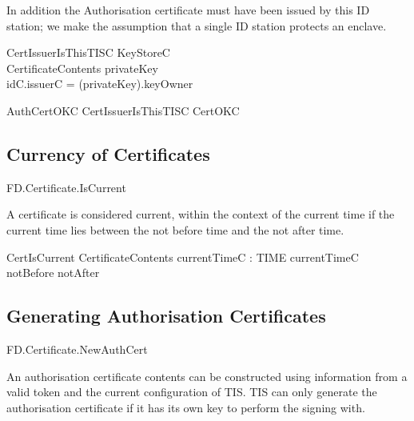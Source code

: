 In addition the Authorisation certificate must have been issued by this ID
station; we make the assumption that a single ID station protects an enclave.

\begin{schema}{CertIssuerIsThisTISC}
        KeyStoreC
\\      CertificateContents
\where
        privateKey \neq \Nil
\\      idC.issuerC = (\The privateKey).keyOwner
\end{schema}

\begin{zed}
        AuthCertOKC  CertIssuerIsThisTISC \land CertOKC
\end{zed}



\subsection{Currency of Certificates}

\begin{traceunit}{FD.Certificate.IsCurrent}
\end{traceunit}

A certificate is considered current, within the context of the current
time if the current time lies between the not before time and the not
after time.

\begin{schema}{CertIsCurrent}
        CertificateContents
\also
        currentTimeC : TIME
\where
        currentTimeC \in notBefore \upto notAfter
\end{schema}


\subsection{Generating Authorisation Certificates}

\begin{traceunit}{FD.Certificate.NewAuthCert}
\end{traceunit}

An authorisation certificate contents can be constructed using information from
a valid token and the current configuration of TIS.
TIS can only generate the authorisation certificate if it has its own
key to perform the signing with.


